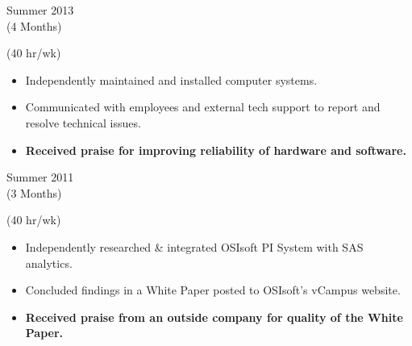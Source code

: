 
\flushleft \begin{minipage}[t]{\dateColWidth}
Summer 2013 \\
(4 Months)
\end{minipage}
\begin{minipage}[t]{0.8\textwidth}
 (40 hr/wk) \\[-1 em]
\begin{adjustwidth}{2.5 em}{0 em}

\begin{itemize} \itemsep-2pt
\setlength{\itemindent}{-2 em}

\item Independently maintained and installed computer systems.
\item Communicated with employees and external tech support to report and resolve technical issues.
\item\textbf{Received praise for improving reliability of hardware and software.}

\end{itemize}
\end{adjustwidth}
\end{minipage}

\divLine

\flushleft \begin{minipage}[t]{\dateColWidth}
Summer 2011 \\
(3 Months)
\end{minipage}
\begin{minipage}[t]{0.8\textwidth}
 (40 hr/wk) \\[-1 em]
\begin{adjustwidth}{2.5 em}{0 em} 

\begin{itemize} \itemsep-2pt
\setlength{\itemindent}{-2 em}

\item Independently researched \& integrated OSIsoft PI System with SAS analytics.
\item Concluded findings in a White Paper posted to OSIsoft's vCampus website.
\item\textbf{Received praise from an outside company for quality of the White Paper.}
\end{itemize}

\end{adjustwidth}
\end{minipage}


